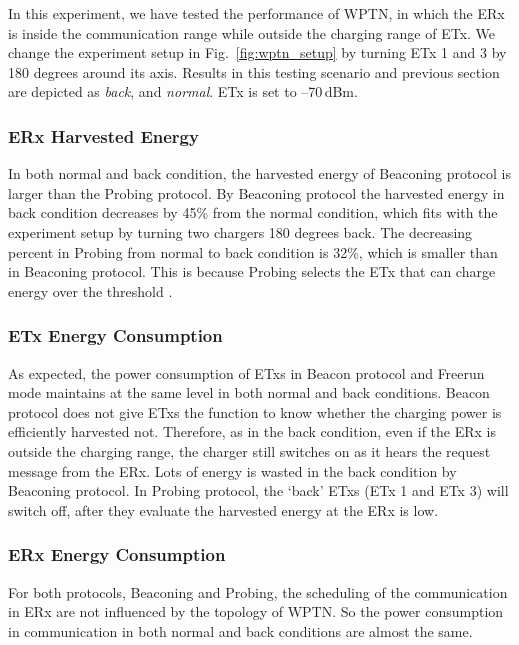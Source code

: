 \documentclass[11pt,draftclsnofoot,journal,onecolumn]{IEEEtran}
\newcommand{\txRssiThreshold}{}
\begin{document}
In this experiment, we have tested the performance of WPTN, in which the ERx is inside the communication range while outside the charging range of ETx. We change the experiment setup in Fig.~\ref{fig:wptn_setup} by turning ETx 1 and 3 by 180 degrees around its axis. Results in this testing scenario and previous section are depicted as \textit{back}, and \textit{normal}. ETx \txRssiThreshold is set to --70\,dBm.

\subsubsection{ERx Harvested Energy}
\label{sec:harvested_energy_nlos}

In both normal and back condition, the harvested energy of Beaconing protocol is larger than the Probing protocol. By Beaconing protocol the harvested energy in back condition decreases by 45\% from the normal condition, which fits with the experiment setup by turning two chargers 180 degrees back. The decreasing percent in Probing from normal to back condition is 32\%, which is smaller than in Beaconing protocol. This is because Probing selects the ETx that can charge energy over the threshold \txRssiThreshold.

\subsubsection{ETx Energy Consumption}
\label{sec:etx_energy_consumption}

As expected, the power consumption of ETxs in Beacon protocol and Freerun mode maintains at the same level in both normal and back conditions. Beacon protocol does not give ETxs the function to know whether the charging power is efficiently harvested not. Therefore, as in the back condition, even if the ERx is outside the charging range, the charger still switches on as it hears the request message from the ERx. Lots of energy is wasted in the back condition by Beaconing protocol. In Probing protocol, the `back' ETxs (ETx 1 and ETx 3) will switch off, after they evaluate the harvested energy at the ERx is low.

\subsubsection{ERx Energy Consumption}
\label{sec:power_consumption_nlos}

For both protocols, Beaconing and Probing, the scheduling of the communication in ERx are not influenced by the topology of WPTN. So the power consumption in communication in both normal and back conditions are almost the same.
\end{document}
